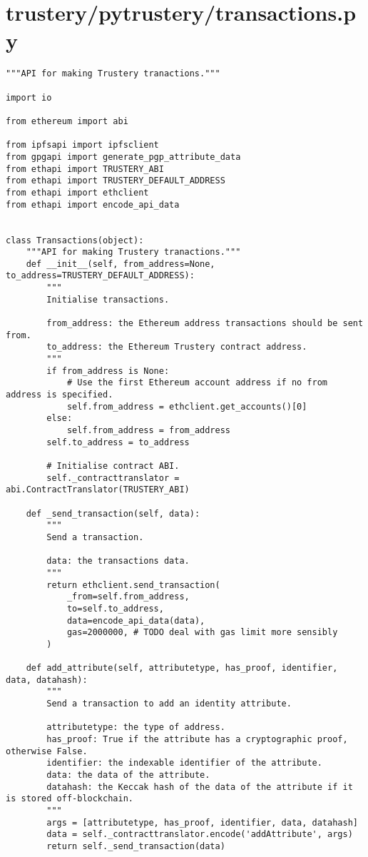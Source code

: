 \documentclass[12pt]{report}
\begin{document}
	\section{trustery/pytrustery/transactions.py}
	\begin{lstlisting}
"""API for making Trustery tranactions."""

import io

from ethereum import abi

from ipfsapi import ipfsclient
from gpgapi import generate_pgp_attribute_data
from ethapi import TRUSTERY_ABI
from ethapi import TRUSTERY_DEFAULT_ADDRESS
from ethapi import ethclient
from ethapi import encode_api_data


class Transactions(object):
    """API for making Trustery tranactions."""
    def __init__(self, from_address=None, to_address=TRUSTERY_DEFAULT_ADDRESS):
        """
        Initialise transactions.

        from_address: the Ethereum address transactions should be sent from.
        to_address: the Ethereum Trustery contract address.
        """
        if from_address is None:
            # Use the first Ethereum account address if no from address is specified.
            self.from_address = ethclient.get_accounts()[0]
        else:
            self.from_address = from_address
        self.to_address = to_address

        # Initialise contract ABI.
        self._contracttranslator = abi.ContractTranslator(TRUSTERY_ABI)

    def _send_transaction(self, data):
        """
        Send a transaction.

        data: the transactions data.
        """
        return ethclient.send_transaction(
            _from=self.from_address,
            to=self.to_address,
            data=encode_api_data(data),
            gas=2000000, # TODO deal with gas limit more sensibly
        )

    def add_attribute(self, attributetype, has_proof, identifier, data, datahash):
        """
        Send a transaction to add an identity attribute.

        attributetype: the type of address.
        has_proof: True if the attribute has a cryptographic proof, otherwise False.
        identifier: the indexable identifier of the attribute.
        data: the data of the attribute.
        datahash: the Keccak hash of the data of the attribute if it is stored off-blockchain.
        """
        args = [attributetype, has_proof, identifier, data, datahash]
        data = self._contracttranslator.encode('addAttribute', args)
        return self._send_transaction(data)


\end{lstlisting}
\end{document}
